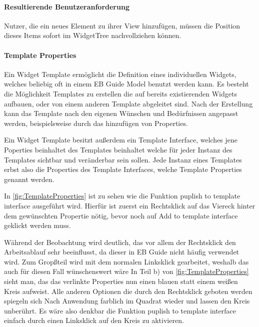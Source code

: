 \paragraph{Resultierende Benutzeranforderung}
Nutzer, die ein neues Element zu ihrer View hinzufügen, müssen die Position dieses Items sofort im WidgetTree nachvollziehen können.

\paragraph{Template Properties}
Ein Widget Template ermöglicht die Definition eines individuellen Widgets, welches beliebig oft in einem EB Guide Model benutzt werden kann.
Es besteht die Möglichkeit Templates zu erstellen die auf bereits existierenden Widgets aufbauen, oder von einem anderen Template abgeleitet sind.
Nach der Erstellung kann das Template nach den eigenen Wünschen und Bedürfnissen angepasst werden, beispielsweise durch das hinzufügen von Properties.

Ein Widget Template besitzt außerdem ein Template Interface, welches jene Poperties beinhaltet des Templates beinhaltet welche für jeder Instanz des Templates sichtbar und veränderbar sein sollen.
Jede Instanz eines Templates erbst also die Properties des Template Interfaces, welche Template Properties genannt werden.\cite{studio_guide}

In \cref{fig:TemplateProperties} ist zu sehen wie die Funktion puplish to template interface ausgeführt wird.
Hierfür ist zuerst ein Rechtsklick auf das Viereck hinter dem gewünschten Propertie nötig, bevor noch auf Add to template interface geklickt werden muss.

Während der Beobachtung wird deutlich, das vor allem der Rechtsklick den Arbeitsablauf sehr beeinflusst, da dieser in EB Guide nicht häufig verwendet wird. 
Zum Gropßteil wird mit dem normalen Linksklick gearbeitet, weshalb das auch für diesen Fall wünschenswert wäre
In Teil b) von \cref{fig:TemplateProperties} sieht man, das das verlinkte Properties nun einen blauen statt einem weißen Kreis aufweist.
Alle anderen Optionen die durch den Rechtsklick geboten werden spiegeln sich Nach Anwendung farblich im Quadrat wieder und lassen den Kreis unberührt.
Es wäre also denkbar die Funktion puplish to template interface einfach durch einen Linksklick auf den Kreis zu aktivieren.

